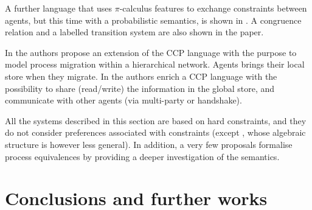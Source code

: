 \documentclass[preprint,12pt]{elsarticle}
\begin{document}
A further language that uses $\pi$-calculus features to exchange constraints between agents, but this time with a probabilistic semantics, is shown in \cite{bortolussi}. A congruence relation and a labelled transition system are also shown in the paper. 

In \cite{catuscia} the authors propose an extension of the CCP language with the purpose to model process migration within a hierarchical network. Agents brings their local store when they migrate. In \cite{lubos} the authors enrich a CCP language with the possibility to share (read/write) the information in the global store, and communicate with other agents (via multi-party or handshake).

All the systems described in this section are based on hard constraints, and  they do not consider preferences associated with constraints (except \cite{buscemi}, whose algebraic structure is however less general). In addition, a very few proposals formalise process equivalences by providing a deeper investigation of the semantics.





\section{Conclusions and further works}\label{sec:conclusion}









\end{document}
